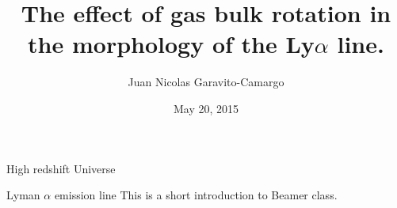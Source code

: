 \documentclass{beamer}
\title[Make a LaTeX presentation using Beamer]{The effect of gas bulk 
rotation in the morphology of the Ly$\alpha$ line.}
\author{Juan Nicolas Garavito-Camargo}
\institute{Universidad de los Andes, Bogot\'a, Colombia}
\date{May 20, 2015}
\begin{document}
\begin{frame}
\titlepage
\author
\institute
\end{frame}

\begin{frame}
High redshift Universe
\end{frame}

\begin{frame}{Lyman $\alpha$ emission line}
This is a short introduction to Beamer class.
\end{frame}
\end{document}
